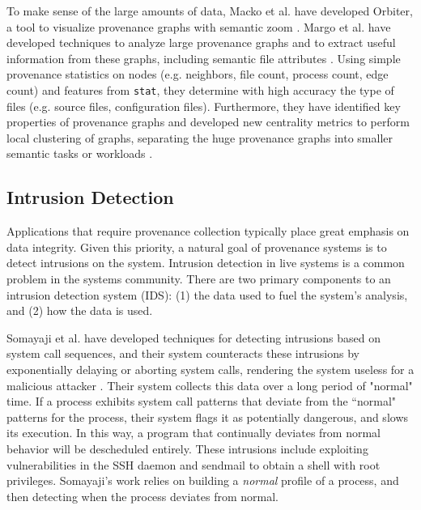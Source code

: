 \documentclass[10pt,twocolumn]{article}
\begin{document}

To make sense of the large amounts of data, Macko et al. have developed Orbiter, a tool to visualize provenance graphs with semantic zoom \cite{orbiter}. Margo et al. have developed techniques to analyze large provenance graphs and to extract useful information from these graphs, including semantic file attributes \cite{fileattributes}. Using simple provenance statistics on nodes (e.g. neighbors, file count, process count, edge count) and features from \texttt{stat}, they determine with high accuracy the type of files (e.g. source files, configuration files). Furthermore, they have identified key properties of provenance graphs and developed new centrality metrics to perform local clustering of graphs, separating the huge provenance graphs into smaller semantic tasks or workloads \cite{clustering}.

\subsection{Intrusion Detection}

Applications that require provenance collection typically place great emphasis on data integrity. Given this priority, a natural goal of provenance systems is to detect intrusions on the system. Intrusion detection in live systems is a common problem in the systems community. There are two primary components to an intrusion detection system (IDS): (1) the data used to fuel the system's analysis, and (2) how the data is used.

Somayaji et al. have developed techniques for detecting intrusions based on system call sequences, and their system counteracts these intrusions by exponentially delaying or aborting system calls, rendering the system useless for a malicious attacker \cite{somayaji}\cite{somayaji-recent}. Their system collects this data over a long period of "normal" time. If a process exhibits system call patterns that deviate from the ``normal" patterns for the process, their system flags it as potentially dangerous, and slows its execution. In this way, a program that continually deviates from normal behavior will be descheduled entirely. These intrusions include exploiting vulnerabilities in the SSH daemon and sendmail to obtain a shell with root privileges. Somayaji's work relies on building a {\em normal} profile of a process, and then detecting when the process deviates from normal.
\end{document}
